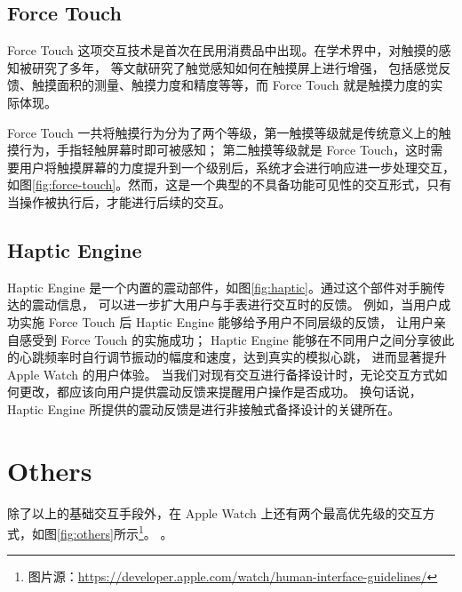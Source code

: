 \subsection{Force Touch}

Force Touch 这项交互技术是首次在民用消费品中出现。在学术界中，对触摸的感知被研究了多年，
\cite{Boring:2012ea,Buschek:2015cd,Vogel:2007:STO:1240624.1240727}等文献研究了触觉感知如何在触摸屏上进行增强，
包括感觉反馈、触摸面积的测量、触摸力度和精度等等，而 Force Touch 就是触摸力度的实际体现。

Force Touch 一共将触摸行为分为了两个等级，第一触摸等级就是传统意义上的触摸行为，手指轻触屏幕时即可被感知；
第二触摸等级就是 Force Touch，这时需要用户将触摸屏幕的力度提升到一个级别后，系统才会进行响应进一步处理交互，
如图\ref{fig:force-touch}。然而，这是一个典型的不具备功能可见性的交互形式，只有当操作被执行后，才能进行后续的交互。

\subsection{Haptic Engine}

Haptic Engine 是一个内置的震动部件，如图\ref{fig:haptic}。通过这个部件对手腕传达的震动信息，
可以进一步扩大用户与手表进行交互时的反馈。
例如，当用户成功实施 Force Touch 后 Haptic Engine 能够给予用户不同层级的反馈，
让用户亲自感受到 Force Touch 的实施成功；
Haptic Engine 能够在不同用户之间分享彼此的心跳频率时自行调节振动的幅度和速度，达到真实的模拟心跳，
进而显著提升 Apple Watch 的用户体验。
当我们对现有交互进行备择设计时，无论交互方式如何更改，都应该向用户提供震动反馈来提醒用户操作是否成功。
换句话说，Haptic Engine 所提供的震动反馈是进行非接触式备择设计的关键所在。

\section{Others}

除了以上的基础交互手段外，在 Apple Watch 上还有两个最高优先级的交互方式，如图\ref{fig:others}所示\footnote{图片源：\url{https://developer.apple.com/watch/human-interface-guidelines/}}。
。


